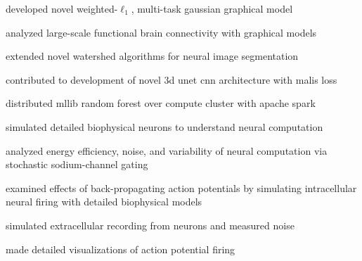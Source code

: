 \begin{minipage}[t]{0.66\textwidth}
\begin{tightitemize}
\item developed novel weighted-$\ell_1$, multi-task gaussian graphical model
\item analyzed large-scale functional brain connectivity with graphical models
\end{tightitemize}
\sectionspace %


\begin{tightitemize}
\item extended novel watershed algorithms for neural image segmentation
\item contributed to development of novel 3d unet cnn architecture with malis loss
\item distributed mllib random forest over compute cluster with apache spark
\end{tightitemize}
\sectionspace %


\begin{tightitemize}
\item simulated detailed biophysical neurons to understand neural computation
\item analyzed energy efficiency, noise, and variability of neural computation via stochastic sodium-channel gating
\end{tightitemize}
\sectionspace %


\begin{tightitemize}
\item examined effects of back-propagating action potentials by simulating intracellular neural firing with detailed biophysical models
\item simulated extracellular recording from neurons and measured noise
\item made detailed visualizations of action potential firing
\end{tightitemize}
\sectionspace %


\end{minipage}
